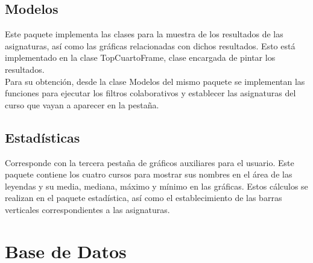 \subsection{Modelos}
Este paquete implementa las clases para la muestra de los resultados de las asignaturas, así como las gráficas relacionadas con dichos resultados. Esto está implementado en la clase TopCuartoFrame, clase encargada de pintar los resultados. \\Para su obtención, desde la clase Modelos del mismo paquete se implementan las funciones para ejecutar los filtros colaborativos y establecer las asignaturas del curso que vayan a aparecer en la pestaña. 

\subsection{Estadísticas}
Corresponde con la tercera pestaña de gráficos auxiliares para el usuario. Este paquete contiene los cuatro cursos para mostrar sus nombres en el área de las leyendas y su media, mediana, máximo y mínimo en las gráficas. Estos cálculos se realizan en el paquete estadística, así como el establecimiento de las barras verticales correspondientes a las asignaturas.


\section{Base de Datos} 